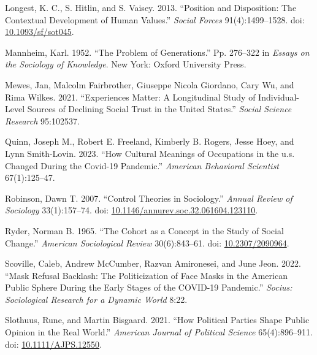 \documentclass[
  12pt,
]{article}
\newlength{\cslhangindent}
\newlength{\cslentryspacingunit} %
\newenvironment{CSLReferences}[2] %
 {%
  \setlength{\parindent}{0pt}
  \ifodd #1
  \let\oldpar\par
  \def\par{\hangindent=\cslhangindent\oldpar}
  \fi
  \setlength{\parskip}{#2\cslentryspacingunit}
 }%
 {}
\begin{document}
\begin{CSLReferences}{1}{0}
\leavevmode{}%
Longest, K. C., S. Hitlin, and S. Vaisey. 2013. {``Position and
{Disposition}: {The} {Contextual} {Development} of {Human} {Values}.''}
\emph{Social Forces} 91(4):1499--1528. doi:
\href{https://doi.org/10.1093/sf/sot045}{10.1093/sf/sot045}.

\leavevmode{}%
Mannheim, Karl. 1952. {``The {Problem} of {Generations}.''} Pp. 276--322
in \emph{Essays on the {Sociology} of {Knowledge}}. New York: Oxford
University Press.

\leavevmode{}%
Mewes, Jan, Malcolm Fairbrother, Giuseppe Nicola Giordano, Cary Wu, and
Rima Wilkes. 2021. {``Experiences Matter: A Longitudinal Study of
Individual-Level Sources of Declining Social Trust in the United
States.''} \emph{Social Science Research} 95:102537.

\leavevmode{}%
Quinn, Joseph M., Robert E. Freeland, Kimberly B. Rogers, Jesse Hoey,
and Lynn Smith-Lovin. 2023. {``How Cultural Meanings of Occupations in
the u.s. Changed During the Covid-19 Pandemic.''} \emph{American
Behavioral Scientist} 67(1):125--47.

\leavevmode{}%
Robinson, Dawn T. 2007. {``Control {Theories} in {Sociology}.''}
\emph{Annual Review of Sociology} 33(1):157--74. doi:
\href{https://doi.org/10.1146/annurev.soc.32.061604.123110}{10.1146/annurev.soc.32.061604.123110}.

\leavevmode{}%
Ryder, Norman B. 1965. {``The {Cohort} as a {Concept} in the {Study} of
{Social} {Change}.''} \emph{American Sociological Review} 30(6):843--61.
doi: \href{https://doi.org/10.2307/2090964}{10.2307/2090964}.

\leavevmode{}%
Scoville, Caleb, Andrew McCumber, Razvan Amironesei, and June Jeon.
2022. {``Mask {Refusal} {Backlash}: {The} {Politicization} of {Face}
{Masks} in the {American} {Public} {Sphere} During the {Early} {Stages}
of the {COVID}-19 {Pandemic}.''} \emph{Socius: Sociological Research for
a Dynamic World} 8:22.

\leavevmode{}%
Slothuus, Rune, and Martin Bisgaard. 2021. {``How {Political} {Parties}
{Shape} {Public} {Opinion} in the {Real} {World}.''} \emph{American
Journal of Political Science} 65(4):896--911. doi:
\href{https://doi.org/10.1111/AJPS.12550}{10.1111/AJPS.12550}.


\end{CSLReferences}
\end{document}
